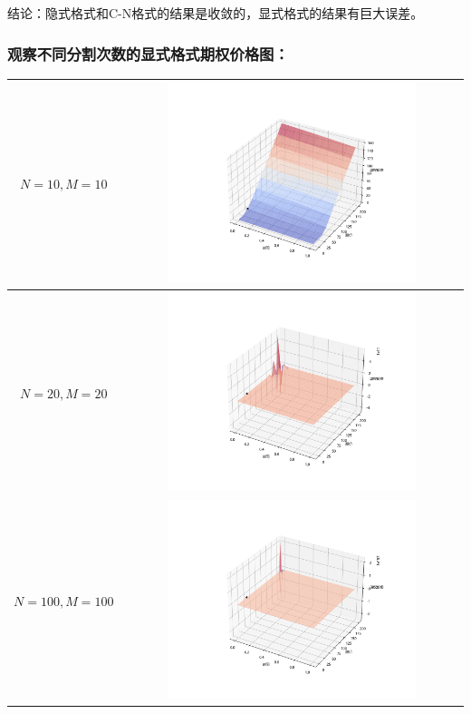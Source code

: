 \documentclass{article}
\begin{document}
结论：隐式格式和C-N格式的结果是收敛的，显式格式的结果有巨大误差。


\subsubsection{观察不同分割次数的显式格式期权价格图：}


\begin{longtable}{|c|c|}
    \hline
    $N=10, M=10$ & \includegraphics[width=0.75\textwidth]{Images/11_option_price_surface_Exp_(10,10).png} \\
    \hline
    $N=20, M=20$ & \includegraphics[width=0.75\textwidth]{Images/12_option_price_surface_Exp_(20,20).png} \\
    \hline
    $N=100, M=100$ & \includegraphics[width=0.75\textwidth]{Images/13_option_price_surface_Exp_(100,100).png} \\
    \hline
\end{longtable}
\end{document}
